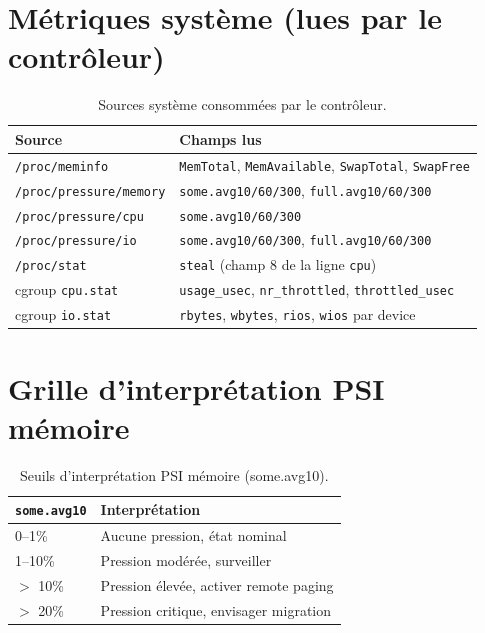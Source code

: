 \section{Métriques système (lues par le contrôleur)}

\begin{table}[H]
\centering
\small
\begin{tabular}{lp{8.5cm}}
\toprule
\textbf{Source} & \textbf{Champs lus} \\
\midrule
\texttt{/proc/meminfo}        & \texttt{MemTotal}, \texttt{MemAvailable}, \texttt{SwapTotal}, \texttt{SwapFree} \\
\texttt{/proc/pressure/memory}& \texttt{some.avg10/60/300}, \texttt{full.avg10/60/300} \\
\texttt{/proc/pressure/cpu}   & \texttt{some.avg10/60/300} \\
\texttt{/proc/pressure/io}    & \texttt{some.avg10/60/300}, \texttt{full.avg10/60/300} \\
\texttt{/proc/stat}           & \texttt{steal} (champ 8 de la ligne \texttt{cpu}) \\
cgroup \texttt{cpu.stat}      & \texttt{usage\_usec}, \texttt{nr\_throttled}, \texttt{throttled\_usec} \\
cgroup \texttt{io.stat}       & \texttt{rbytes}, \texttt{wbytes}, \texttt{rios}, \texttt{wios} par device \\
\bottomrule
\end{tabular}
\caption{Sources système consommées par le contrôleur.}
\end{table}

\section{Grille d'interprétation PSI mémoire}

\begin{table}[H]
\centering
\small
\begin{tabular}{ll}
\toprule
\textbf{\texttt{some.avg10}} & \textbf{Interprétation} \\
\midrule
0--1\%       & Aucune pression, état nominal \\
1--10\%      & Pression modérée, surveiller \\
$>$ 10\%     & Pression élevée, activer remote paging \\
$>$ 20\%     & Pression critique, envisager migration \\
\bottomrule
\end{tabular}
\caption{Seuils d'interprétation PSI mémoire (some.avg10).}
\end{table}
